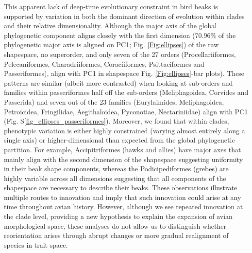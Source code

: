 \documentclass[12pt,letterpaper]{article}
\begin{document}
This apparent lack of deep-time evolutionary constraint in bird beaks is supported by variation in both the dominant direction of evolution within clades and their relative dimensionality.
Although the major axis of the global phylogenetic component aligns closely with the first dimension (70.96\% of the phylogenetic major axis is aligned on PC1; Fig. \ref{Fig:ellipses}) of the raw shapespace, no superorder, and only seven of the 27 orders (Procellariiformes, Pelecaniformes, Charadriiformes, Coraciiformes, Psittaciformes and Passeriformes), align with PC1 in shapespace Fig. \ref{Fig:ellipses}-bar plots).
These patterns are similar (albeit more contrasted) when looking at sub-orders and families within passeriformes half off the sub-orders (Meliphagoidea, Corvides and Passerida) and seven out of the 23 families (Eurylaimides, Meliphagoidea, Petroicidea, Fringilidae, Aegithaloidea, Pyconotiae, Nectariniidae) align with PC1 (Fig. S\ref{fig_ellipses_passeriformes}).
Moreover, we found that within clades, phenotypic variation is either highly constrained (varying almost entirely along a single axis) or higher-dimensional than expected from the global phylogenetic partition.
For example, Accipitriformes (hawks and allies) have major axes that mainly align with the second dimension of the shapespace suggesting uniformity in their beak shape components, whereas the Podicipediformes (grebes) are highly variable across all dimensions suggesting that all components of the shapespace are necessary to describe their beaks.
These observations illustrate multiple routes to innovation and imply that such innovation could arise at any time throughout avian history.
However, although we see repeated innovation at the clade level, providing a new hypothesis to explain the expansion of avian morphological space, these analyses do not allow us to distinguish whether reorientation arises through abrupt changes or more gradual realignment of species in trait space.
\end{document}
